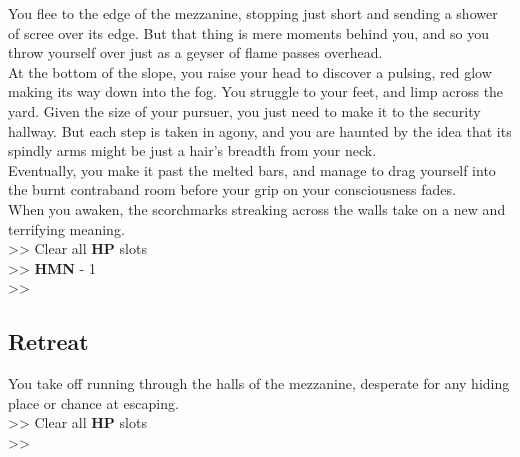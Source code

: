 You flee to the edge of the mezzanine, stopping just short and sending a shower of scree over its edge. But that thing is mere moments behind you, and so you throw yourself over just as a geyser of flame passes overhead.\\

At the bottom of the slope, you raise your head to discover a pulsing, red glow making its way down into the fog. You struggle to your feet, and limp across the yard. Given the size of your pursuer, you just need to make it to the security hallway. But each step is taken in agony, and you are haunted by the idea that its spindly arms might be just a hair’s breadth from your neck.\\

Eventually, you make it past the melted bars, and manage to drag yourself into the burnt contraband room before your grip on your consciousness fades.\\

When you awaken, the scorchmarks streaking across the walls take on a new and terrifying meaning.\\

>> Clear all \textbf{HP} slots\\
>> \textbf{HMN} - 1\\
>> 

\subsection*{Retreat}

You take off running through the halls of the mezzanine, desperate for any hiding place or chance at escaping.\\

>> Clear all \textbf{HP} slots\\
>> 